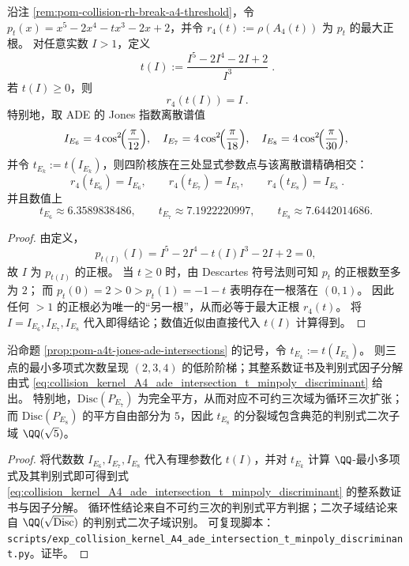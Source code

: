 \begin{proposition}\label{prop:pom-a4t-jones-ade-intersections}
沿注 \ref{rem:pom-collision-rh-break-a4-threshold}，令
\(
p_t(x)=x^5-2x^4-tx^3-2x+2
\)，并令
\(
r_4(t):=\rho(A_4(t))
\)
为 \(p_t\) 的最大正根。
对任意实数 \(I>1\)，定义
\[
\boxed{\;
t(I):=\frac{I^5-2I^4-2I+2}{I^3}\; }.
\]
若 \(t(I)\ge 0\)，则
\[
\boxed{\ r_4(t(I))=I\ }.
\]
特别地，取 ADE 的 Jones 指数离散谱值
\[
I_{E_6}=4\cos^2\!\Bigl(\frac{\pi}{12}\Bigr),\quad
I_{E_7}=4\cos^2\!\Bigl(\frac{\pi}{18}\Bigr),\quad
I_{E_8}=4\cos^2\!\Bigl(\frac{\pi}{30}\Bigr),
\]
并令 \(t_{E_k}:=t(I_{E_k})\)，则四阶核族在三处显式参数点与该离散谱精确相交：
\[
\boxed{\ r_4(t_{E_6})=I_{E_6},\qquad r_4(t_{E_7})=I_{E_7},\qquad r_4(t_{E_8})=I_{E_8}\ }.
\]
并且数值上
\[
t_{E_6}\approx 6.3589838486,\qquad
t_{E_7}\approx 7.1922220997,\qquad
t_{E_8}\approx 7.6442014686.
\]
\end{proposition}
\begin{proof}
由定义，
\[
p_{t(I)}(I)=I^5-2I^4-t(I)I^3-2I+2=0,
\]
故 \(I\) 为 \(p_{t(I)}\) 的正根。
当 \(t\ge 0\) 时，由 Descartes 符号法则可知 \(p_t\) 的正根数至多为 \(2\)；
而 \(p_t(0)=2>0>p_t(1)=-1-t\) 表明存在一根落在 \((0,1)\)。
因此任何 \(>1\) 的正根必为唯一的“另一根”，从而必等于最大正根 \(r_4(t)\)。
将 \(I=I_{E_6},I_{E_7},I_{E_8}\) 代入即得结论；数值近似由直接代入 \(t(I)\) 计算得到。
\end{proof}

\begin{proposition}\label{prop:pom-a4t-ade-intersection-t-minpoly-discriminant}
沿命题 \ref{prop:pom-a4t-jones-ade-intersections} 的记号，令 \(t_{E_k}:=t(I_{E_k})\)。
则三点的最小多项式次数呈现 \((2,3,4)\) 的低阶阶梯；其整系数证书及判别式因子分解由式 \eqref{eq:collision_kernel_A4_ade_intersection_t_minpoly_discriminant} 给出。
特别地，\(\mathrm{Disc}(P_{E_7})\) 为完全平方，从而对应不可约三次域为循环三次扩张；
而 \(\mathrm{Disc}(P_{E_8})\) 的平方自由部分为 \(5\)，因此 \(t_{E_8}\) 的分裂域包含典范的判别式二次子域 \(\QQ(\sqrt5)\)。
\end{proposition}
\begin{proof}
将代数数 \(I_{E_6},I_{E_7},I_{E_8}\) 代入有理参数化 \(t(I)\)，并对 \(t_{E_k}\) 计算 \(\QQ\)-最小多项式及其判别式即可得到式 \eqref{eq:collision_kernel_A4_ade_intersection_t_minpoly_discriminant} 的整系数证书与因子分解。
循环性结论来自不可约三次的判别式平方判据；二次子域结论来自 \(\QQ(\sqrt{\mathrm{Disc}})\) 的判别式二次子域识别。
可复现脚本：\texttt{scripts/exp\_collision\_kernel\_A4\_ade\_intersection\_t\_minpoly\_discriminant.py}。证毕。
\end{proof}

